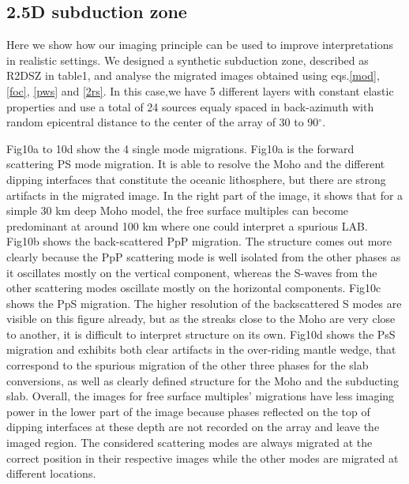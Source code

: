 \documentclass[10pt,a4paper]{article}
\numberwithin{equation}{section}
\DeclareRobustCommand{\rq}[1]{{\sethlcolor{myblue}\hl{#1}}}
\begin{document}
\subsection{2.5D subduction zone}

Here we show how our imaging principle can be used to improve interpretations in realistic settings.
We designed a synthetic subduction zone, described as R2DSZ in table1, and analyse the migrated images obtained using eqs.\eqref{mod}, \eqref{foc}, \eqref{pws} and \eqref{2rs}.
In this case,we have 5 different layers with constant elastic properties and use a total of 24 sources equaly spaced in back-azimuth with random epicentral distance to the center of the array of 30 to 90$^{\circ}$.

Fig10a to 10d show the 4 single mode migrations.
Fig10a is the forward scattering PS mode migration.
It is able to resolve the Moho and the different dipping interfaces that constitute the oceanic lithosphere, but there are strong artifacts in the migrated image.
In the right part of the image, it shows that for a simple 30 km deep Moho model, the free surface multiples can become predominant at around 100 km where one could interpret a spurious LAB.
Fig10b shows the back-scattered PpP migration.
The structure comes out more clearly because the PpP scattering mode is well isolated from the other phases as it oscillates mostly on the vertical component, whereas the S-waves from the other scattering modes oscillate mostly on the horizontal components.
Fig10c shows the PpS migration.
The higher resolution of the backscattered S modes are visible on this figure already, but as the streaks close to the Moho are very close to another, it is difficult to interpret structure on its own.
Fig10d shows the PsS migration and exhibits both clear artifacts in the over-riding mantle wedge, that correspond to the spurious migration of the other three phases for the slab conversions, as well as clearly defined structure for the Moho and the subducting slab.
Overall, the images for free surface multiples’ migrations have less imaging power in the lower part of the image because phases reflected on the top of dipping interfaces at these depth are not recorded on the array and leave the imaged region.
The considered scattering modes are always migrated at the correct position in their respective images while the other modes are migrated at different locations. 
\end{document}
